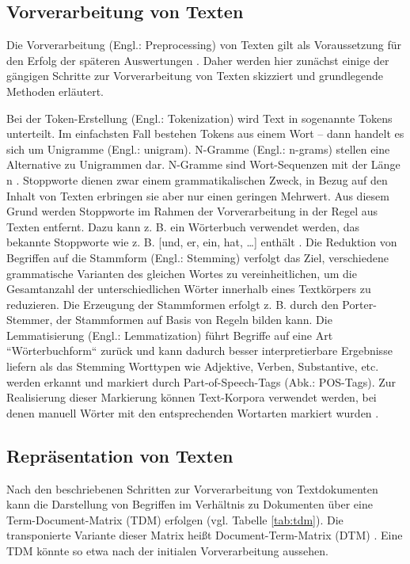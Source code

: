 \subsection{Vorverarbeitung von Texten}

Die Vorverarbeitung (Engl.: Preprocessing) von Texten gilt als Voraussetzung für den Erfolg der späteren Auswertungen \cite[S. 46]{Anandarajan}. Daher werden hier zunächst einige der gängigen Schritte zur Vorverarbeitung von Texten skizziert und grundlegende Methoden erläutert.

Bei der Token-Erstellung (Engl.: Tokenization) wird Text in sogenannte Tokens unterteilt. Im einfachsten Fall bestehen Tokens aus einem Wort – dann handelt es sich um Unigramme (Engl.: unigram). N-Gramme (Engl.: n-grams) stellen eine Alternative zu Unigrammen dar. N-Gramme sind Wort-Sequenzen mit der Länge n \cite[S. 48]{Anandarajan}. Stoppworte dienen zwar einem grammatikalischen Zweck, in Bezug auf den Inhalt von Texten erbringen sie aber nur einen geringen Mehrwert. Aus diesem Grund werden Stoppworte im Rahmen der Vorverarbeitung in der Regel aus Texten entfernt. Dazu kann z. B. ein Wörterbuch verwendet werden, das bekannte Stoppworte wie z. B. [und, er, ein, hat, …] enthält \cite[S. 50-53]{Anandarajan}. Die Reduktion von Begriffen auf die Stammform (Engl.: Stemming) verfolgt das Ziel, verschiedene grammatische Varianten des gleichen Wortes zu vereinheitlichen, um die Gesamtanzahl der unterschiedlichen Wörter innerhalb eines Textkörpers zu reduzieren. Die Erzeugung der Stammformen erfolgt z. B. durch den Porter-Stemmer, der Stammformen auf Basis von Regeln bilden kann. Die Lemmatisierung (Engl.: Lemmatization) führt Begriffe auf eine Art ``Wörterbuchform`` zurück und kann dadurch besser interpretierbare Ergebnisse liefern als das Stemming \cite[S. 30-32]{Manning} Worttypen wie Adjektive, Verben, Substantive, etc. werden erkannt und markiert durch Part-of-Speech-Tags (Abk.: POS-Tags). Zur Realisierung dieser Markierung können Text-Korpora verwendet werden, bei denen manuell Wörter mit den entsprechenden Wortarten markiert wurden \cite[S. 58]{Anandarajan}.

\subsection{Repräsentation von Texten} 

Nach den beschriebenen Schritten zur Vorverarbeitung von Textdokumenten kann die Darstellung von Begriffen im Verhältnis zu Dokumenten über eine Term-Document-Matrix (TDM) erfolgen (vgl. Tabelle \ref{tab:tdm}). Die transponierte Variante dieser Matrix heißt Document-Term-Matrix (DTM) \cite[S. 61ff]{Anandarajan}. Eine TDM könnte so etwa nach der initialen Vorverarbeitung aussehen.


